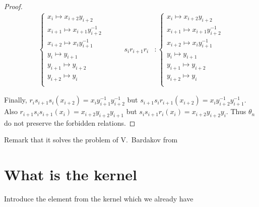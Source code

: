 \documentclass{article}
\begin{document}
\begin{proof}
\begin{align*}
\begin{cases}
x_i\mapsto x_{i+2}y_{i+2}\\

x_{i+1}\mapsto x_{i+1}y_{i+2}^{-1}\\

x_{i+2}\mapsto x_iy_{i+1}^{-1}\\

y_{i} \mapsto y_{i+1}\\

y_{i+1} \mapsto y_{i+2}\\

y_{i+2} \mapsto y_{i}\\

\end{cases} &\qquad

s_ir_{i+1}r_i &:

\begin{cases}

x_i\mapsto x_{i+2}y_{i+2}\\

x_{i+1}\mapsto x_{i+1}y_{i+2}^{-1}\\

x_{i+2}\mapsto x_iy_{i+1}^{-1}\\

y_{i}\mapsto y_{i+1}\\

y_{i+1}\mapsto y_{i+2}\\

y_{i+2}\mapsto y_{i}\\

\end{cases} 

\end{align*}



Finally, $r_is_{i+1}s_i(x_{i+2})=x_iy_{i+1}^{-1}y_{i+2}^{-1}$ but $s_{i+1}s_ir_{i+1}(x_{i+2})=x_iy_{i+2}^{-1}y_{i+1}^{-1}$. Also $r_{i+1}s_is_{i+1}(x_i)=x_{i+2}y_{i+2}y_{i+1}$ but $s_is_{i+1}r_i(x_i)=x_{i+2}y_{i+2}y_i$. Thus $\theta_n$ do not preserve the forbidden relations.    

\end{proof}



Remark that it solves the problem of V.~Bardakov from \cite{problems}

\section{What is the kernel}

Introduce the element from the kernel which we already have
\end{document}
